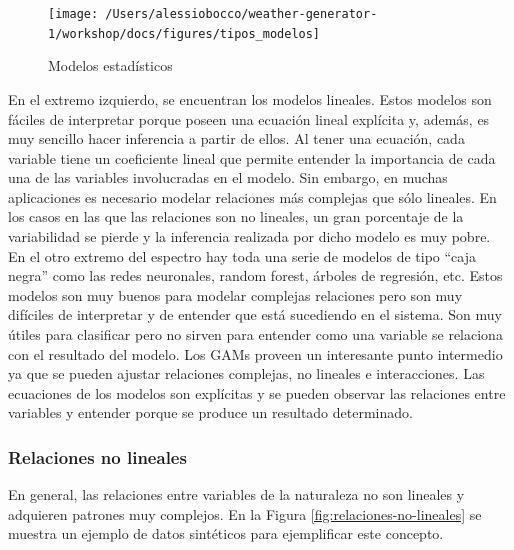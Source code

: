 \documentclass[
  12pt]{article}
\begin{document}
\begin{figure}[H]

{\centering \texttt{[image: /Users/alessiobocco/weather-generator-1/workshop/docs/figures/tipos\_modelos]} 

}

\caption{Modelos estadísticos}\label{fig:tipos-modelos}
\end{figure}

En el extremo izquierdo, se encuentran los modelos lineales. Estos modelos son fáciles de interpretar porque poseen una ecuación lineal explícita y, además, es muy sencillo hacer inferencia a partir de ellos. Al tener una ecuación, cada variable tiene un coeficiente lineal que permite entender la importancia de cada una de las variables involucradas en el modelo. Sin embargo, en muchas aplicaciones es necesario modelar relaciones más complejas que sólo lineales. En los casos en las que las relaciones son no lineales, un gran porcentaje de la variabilidad se pierde y la inferencia realizada por dicho modelo es muy pobre.
En el otro extremo del espectro hay toda una serie de modelos de tipo ``caja negra'' como las redes neuronales, random forest, árboles de regresión, etc. Estos modelos son muy buenos para modelar complejas relaciones pero son muy difíciles de interpretar y de entender que está sucediendo en el sistema. Son muy útiles para clasificar pero no sirven para entender como una variable se relaciona con el resultado del modelo.
Los GAMs proveen un interesante punto intermedio ya que se pueden ajustar relaciones complejas, no lineales e interacciones. Las ecuaciones de los modelos son explícitas y se pueden observar las relaciones entre variables y entender porque se produce un resultado determinado.

\hypertarget{relaciones-no-lineales}{%
\subsubsection{Relaciones no lineales}\label{relaciones-no-lineales}}

En general, las relaciones entre variables de la naturaleza no son lineales y adquieren patrones muy complejos. En la Figura \ref{fig:relaciones-no-lineales} se muestra un ejemplo de datos sintéticos para ejemplificar este concepto.
\end{document}
